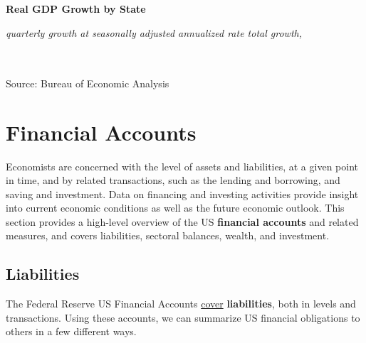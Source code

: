\documentclass{report}
\begin{document}
\normalsize \textbf{Real GDP Growth by State}\\
\footnotesize{\textit{quarterly growth at seasonally adjusted annualized rate \hspace{20mm} total growth, }\\ 

\vspace{-4.5mm}
\hspace{-3mm} \noindent {} \setlength{\tabcolsep}{2.0pt} \color{black!90}
		{\renewcommand{\arraystretch}{1.44}
		 \begin{tabular}{p{29mm} R{8.5mm} R{8.5mm} R{8.5mm} R{8.5mm} R{8.5mm} p{0mm} R{11mm} R{11mm} R{12mm} }
		 \hline
		\end{tabular}}	\\

\vspace{-3mm}	
\footnotesize{Source: Bureau of Economic Analysis}

\newpage
\hypertarget{ofa}{\label{ofa}} \vspace{-3mm}
\section*{Financial Accounts} 
\begin{minipage}{0.76\textwidth}  
\vspace{-3mm}

\small Economists are concerned with the level of assets and liabilities, at a given point in time, and by related transactions, such as the lending and borrowing, and saving and investment. Data on financing and investing activities provide insight into current economic conditions as well as the future economic outlook. This section provides a high-level overview of the US \textbf{financial accounts} and related measures, and covers liabilities, sectoral balances, wealth, and investment. 
\hypertarget{ofl}{\label{ofl}}
\subsection*{Liabilities}  
\small The Federal Reserve US Financial Accounts \href{https://www.federalreserve.gov/releases/z1/}{cover} \textbf{liabilities}, both in levels and transactions. Using these accounts, we can summarize US financial obligations to others in a few different ways. 


\end{minipage}}
\end{document}
